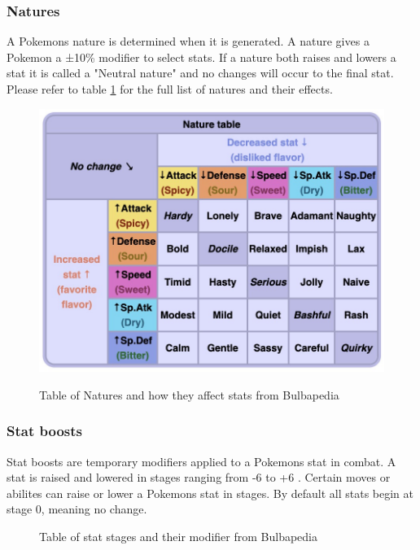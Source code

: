 \subsubsection{Natures}
A Pokemons nature \cite{Natures} is determined when it is generated. A nature gives a Pokemon a ±10\% modifier to select stats.
If a nature both raises and lowers a stat it is called a "Neutral nature" and no changes will occur to the final stat.
Please refer to table \ref{tab:nature-table} for the full list of natures and their effects.
\begin{figure}[h]
  \centering
  \includegraphics[width=.8\textwidth]{assets/nature-stat-table.jpg}
  \label{tab:nature-table}
  \caption{Table of Natures and how they affect stats from Bulbapedia \cite{Natures}}
\end{figure}

\subsubsection{Stat boosts}
Stat boosts are temporary modifiers applied to a Pokemons stat in combat. A stat is raised and lowered in stages ranging from -6 to +6 \cite{StatBoosts}.
Certain moves or abilites can raise or lower a Pokemons stat in stages. By default all stats begin at stage 0, meaning no change.

\begin{figure}[h]
  \centering
  \label{tab:stat-stage-modifiers}
  \caption{Table of stat stages and their modifier from Bulbapedia \cite{StatBoosts}}

\end{figure}

